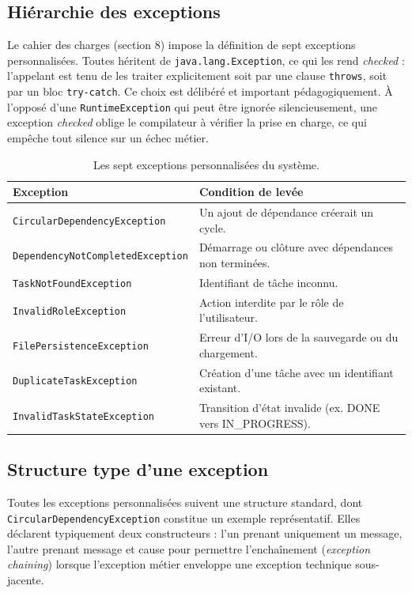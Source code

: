 \documentclass[11pt]{article}
\begin{document}
\subsection{Hiérarchie des exceptions}
Le cahier des charges (section 8) impose la définition de sept exceptions
personnalisées. Toutes héritent de \texttt{java.lang.Exception}, ce qui
les rend \textit{checked} : l'appelant est tenu de les traiter
explicitement soit par une clause \texttt{throws}, soit par un bloc
\texttt{try-catch}. Ce choix est délibéré et important pédagogiquement.
À l'opposé d'une \texttt{RuntimeException} qui peut être ignorée
silencieusement, une exception \textit{checked} oblige le compilateur à
vérifier la prise en charge, ce qui empêche tout silence sur un échec
métier.

\begin{table}[H]
\centering
\small
\begin{tabular}{lp{9.5cm}}
\toprule
\textbf{Exception} & \textbf{Condition de levée} \\
\midrule
\texttt{CircularDependencyException}     & Un ajout de dépendance créerait un cycle. \\
\texttt{DependencyNotCompletedException} & Démarrage ou clôture avec dépendances non terminées. \\
\texttt{TaskNotFoundException}           & Identifiant de tâche inconnu. \\
\texttt{InvalidRoleException}            & Action interdite par le rôle de l'utilisateur. \\
\texttt{FilePersistenceException}        & Erreur d'I/O lors de la sauvegarde ou du chargement. \\
\texttt{DuplicateTaskException}          & Création d'une tâche avec un identifiant existant. \\
\texttt{InvalidTaskStateException}       & Transition d'état invalide (ex. DONE vers IN\_PROGRESS). \\
\bottomrule
\end{tabular}
\caption{Les sept exceptions personnalisées du système.}
\end{table}

\subsection{Structure type d'une exception}
Toutes les exceptions personnalisées suivent une structure standard,
dont \texttt{CircularDependencyException} constitue un exemple
représentatif. Elles déclarent typiquement deux constructeurs : l'un
prenant uniquement un message, l'autre prenant message et cause pour
permettre l'enchaînement (\textit{exception chaining}) lorsque
l'exception métier enveloppe une exception technique sous-jacente.
\end{document}
